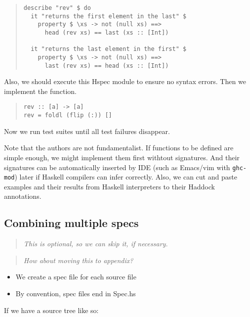 \documentclass[preprint]{sigplanconf}
\begin{document}
\begin{quote}
\small
\begin{verbatim}
describe "rev" $ do
  it "returns the first element in the last" $
    property $ \xs -> not (null xs) ==>
      head (rev xs) == last (xs :: [Int])

  it "returns the last element in the first" $
    property $ \xs -> not (null xs) ==>
      last (rev xs) == head (xs :: [Int])
\end{verbatim}
\end{quote}

\noindent Also, we should execute this Hspec module
to ensure no syntax errors.
Then we implement the function.

\begin{quote}
\small
\begin{verbatim}
rev :: [a] -> [a]
rev = foldl (flip (:)) []
\end{verbatim}
\end{quote}

\noindent Now we run test suites until
all test failures disappear.

Note that the authors are not fundamentalist.
If functions to be defined are simple enough,
we might implement them first withtout signatures.
And their signatures can be automatically
inserted by IDE (such as Emacs/vim with {\tt ghc-mod}) later
if Haskell compilers can infer correctly.
Also, we can cut and paste examples and their results
from Haskell interpreters to their Haddock annotations.

\subsection{Combining multiple specs}

\begin{quote}
\emph{This is optional, so we can skip it, if necessary.}
\end{quote}

\begin{quote}
\emph{How about moving this to appendix?}
\end{quote}

\begin{itemize}
\item We create a spec file for each source file
\item By convention, spec files end in Spec.hs
\end{itemize}

\noindent If we have a source tree like so:
\end{document}
